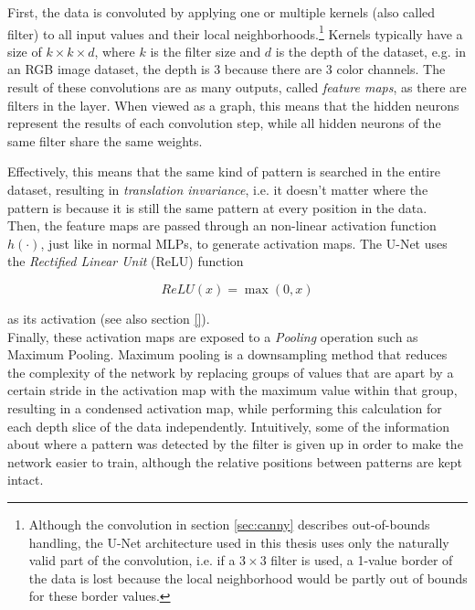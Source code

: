 \noindent First, the data is convoluted by applying one or multiple kernels (also called filter) to all input values and their local neighborhoods.\footnote{Although the convolution in section \ref{sec:canny} describes out-of-bounds handling, the U-Net architecture used in this thesis uses only the naturally valid part of the convolution, i.e. if a $3 \times 3$ filter is used, a 1-value border of the data is lost because the local neighborhood would be partly out of bounds for these border values.} Kernels typically have a size of $k \times k \times d$, where $k$ is the filter size and $d$ is the depth of the dataset, e.g. in an RGB image dataset, the depth is 3 because there are 3 color channels. The result of these convolutions are as many outputs, called \textit{feature maps}, as there are filters in the layer. When viewed as a graph, this means that the hidden neurons represent the results of each convolution step, while all hidden neurons of the same filter share the same weights.

Effectively, this means that the same kind of pattern is searched in the entire dataset, resulting in \textit{translation invariance}, i.e. it doesn't matter where the pattern is because it is still the same pattern at every position in the data.\\

\noindent Then, the feature maps are passed through an non-linear activation function $h(\cdot)$, just like in normal MLPs, to generate activation maps. The U-Net uses the \textit{Rectified Linear Unit} (ReLU) function

\[ ReLU(x) = \max(0, x) \]

\noindent as its activation (see also section \ref{}).\\

\noindent Finally, these activation maps are exposed to a \textit{Pooling} operation such as Maximum Pooling. Maximum pooling is a downsampling method that reduces the complexity of the network by replacing groups of values that are apart by a certain stride in the activation map with the maximum value within that group, resulting in a condensed activation map, while performing this calculation for each depth slice of the data independently. Intuitively, some of the information about where a pattern was detected by the filter is given up in order to make the network easier to train, although the relative positions between patterns are kept intact.\\


